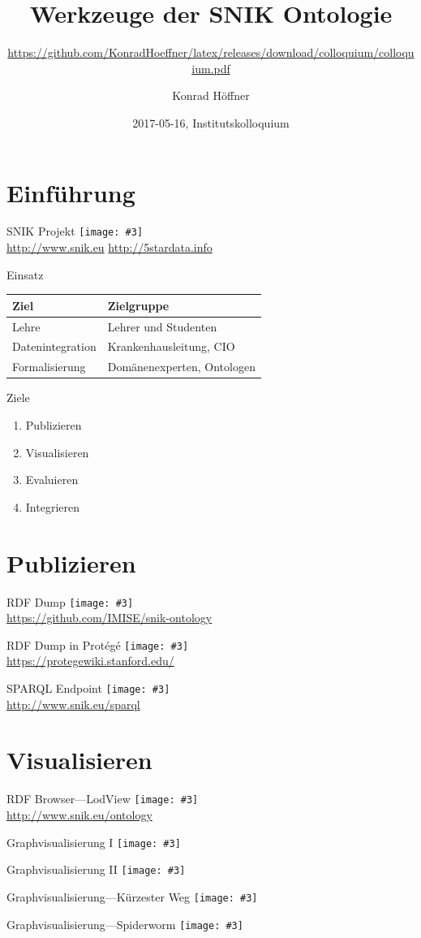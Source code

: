 \documentclass{beamer}
\author{Konrad Höffner}
\date{2017-05-16, Institutskolloquium}
\title{Werkzeuge der SNIK Ontologie}
\subtitle{\url{https://github.com/KonradHoeffner/latex/releases/download/colloquium/colloquium.pdf}}
\newcommand{\imageslide}[3][]
{
\begin{frame}{#2}
\centering\texttt{[image: \#3]}
\\#1
\end{frame}
}
\begin{document}
\begin{frame}
\titlepage
\end{frame}

\section{Einführung}

\imageslide[\url{http://www.snik.eu} \url{http://5stardata.info}]{SNIK Projekt}{img/5star.png}

\begin{frame}{Einsatz}
\centering
\begin{tabular}{ll}
\toprule
\textbf{Ziel}	&\textbf{Zielgruppe}\\
\midrule
Lehre			&Lehrer und Studenten\\ 
Datenintegration	&Krankenhausleitung, CIO\\
Formalisierung		&Domänenexperten, Ontologen\\
\bottomrule
\end{tabular}
\end{frame}

\begin{frame}{Ziele}
\begin{enumerate}
\item Publizieren 
\item Visualisieren 
\item Evaluieren
\item Integrieren 
\end{enumerate}
\end{frame}

\section{Publizieren}

\imageslide[\url{https://github.com/IMISE/snik-ontology}]{RDF Dump}{img/rdfdump.png}
\imageslide[\url{https://protegewiki.stanford.edu/}]{RDF Dump in Protégé}{img/protege.png}
\imageslide[\url{http://www.snik.eu/sparql}]{SPARQL Endpoint}{img/sparqlresult.png}

\section{Visualisieren}

\imageslide[\url{http://www.snik.eu/ontology}]{RDF Browser---LodView}{img/browse-cio.png}

\imageslide{Graphvisualisierung I}{img/graph-entitytype.png}
\imageslide{Graphvisualisierung II}{img/graph-erf.png}
\imageslide{Graphvisualisierung---Kürzester Weg}{img/shortestpath.png}
\imageslide{Graphvisualisierung---Spiderworm}{img/spiderworm.png}
\end{document}
